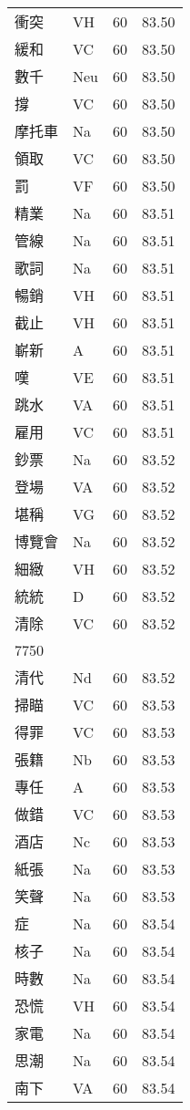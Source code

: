 \documentclass[twocolumn]{book}
\begin{document}
\begin{supertabular}{llrr}
衝突 & VH & 60 &  83.50\\
緩和 & VC & 60 &  83.50\\
數千 & Neu & 60 &  83.50\\
撐 & VC & 60 &  83.50\\
摩托車 & Na & 60 &  83.50\\
領取 & VC & 60 &  83.50\\
罰 & VF & 60 &  83.50\\
精業 & Na & 60 &  83.51\\
管線 & Na & 60 &  83.51\\
歌詞 & Na & 60 &  83.51\\
暢銷 & VH & 60 &  83.51\\
截止 & VH & 60 &  83.51\\
嶄新 & A & 60 &  83.51\\
嘆 & VE & 60 &  83.51\\
跳水 & VA & 60 &  83.51\\
雇用 & VC & 60 &  83.51\\
鈔票 & Na & 60 &  83.52\\
登場 & VA & 60 &  83.52\\
堪稱 & VG & 60 &  83.52\\
博覽會 & Na & 60 &  83.52\\
細緻 & VH & 60 &  83.52\\
統統 & D & 60 &  83.52\\
清除 & VC & 60 &  83.52\\
7750\\
清代 & Nd & 60 &  83.52\\
掃瞄 & VC & 60 &  83.53\\
得罪 & VC & 60 &  83.53\\
張籍 & Nb & 60 &  83.53\\
專任 & A & 60 &  83.53\\
做錯 & VC & 60 &  83.53\\
酒店 & Nc & 60 &  83.53\\
紙張 & Na & 60 &  83.53\\
笑聲 & Na & 60 &  83.53\\
症 & Na & 60 &  83.54\\
核子 & Na & 60 &  83.54\\
時數 & Na & 60 &  83.54\\
恐慌 & VH & 60 &  83.54\\
家電 & Na & 60 &  83.54\\
思潮 & Na & 60 &  83.54\\
南下 & VA & 60 &  83.54\\

\end{supertabular}
\end{document}
